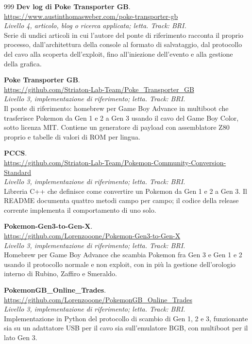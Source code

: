 \begin{thebibliography}{999}
  \textbf{Dev log di Poke Transporter GB}.
  \\ \url{https://www.austinthomasweber.com/poke-transporter-gb}
  \\ \emph{Livello 4, articolo, blog o ricerca applicata; letta. Track: BRI.}
  \\ Serie di undici articoli in cui l'autore del ponte di riferimento racconta il proprio processo, dall'architettura della console al formato di salvataggio, dal protocollo del cavo alla scoperta dell'exploit, fino all'iniezione dell'evento e alla gestione della grafica.

  \textbf{Poke Transporter GB}.
  \\ \url{https://github.com/Striaton-Lab-Team/Poke_Transporter_GB}
  \\ \emph{Livello 3, implementazione di riferimento; letta. Track: BRI.}
  \\ Il ponte di riferimento: homebrew per Game Boy Advance in multiboot che trasferisce Pokemon da Gen 1 e 2 a Gen 3 usando il cavo del Game Boy Color, sotto licenza MIT. Contiene un generatore di payload con assemblatore Z80 proprio e tabelle di valori di ROM per lingua.

  \textbf{PCCS}.
  \\ \url{https://github.com/Striaton-Lab-Team/Pokemon-Community-Conversion-Standard}
  \\ \emph{Livello 3, implementazione di riferimento; letta. Track: BRI.}
  \\ Libreria C++ che definisce come convertire un Pokemon da Gen 1 e 2 a Gen 3. Il README documenta quattro metodi campo per campo; il codice della release corrente implementa il comportamento di uno solo.

  \textbf{Pokemon-Gen3-to-Gen-X}.
  \\ \url{https://github.com/Lorenzooone/Pokemon-Gen3-to-Gen-X}
  \\ \emph{Livello 3, implementazione di riferimento; letta. Track: BRI.}
  \\ Homebrew per Game Boy Advance che scambia Pokemon fra Gen 3 e Gen 1 e 2 usando il protocollo normale e non exploit, con in più la gestione dell'orologio interno di Rubino, Zaffiro e Smeraldo.

  \textbf{PokemonGB\_Online\_Trades}.
  \\ \url{https://github.com/Lorenzooone/PokemonGB_Online_Trades}
  \\ \emph{Livello 3, implementazione di riferimento; letta. Track: BRI.}
  \\ Implementazione in Python del protocollo di scambio di Gen 1, 2 e 3, funzionante sia su un adattatore USB per il cavo sia sull'emulatore BGB, con multiboot per il lato Gen 3.


\end{thebibliography}
